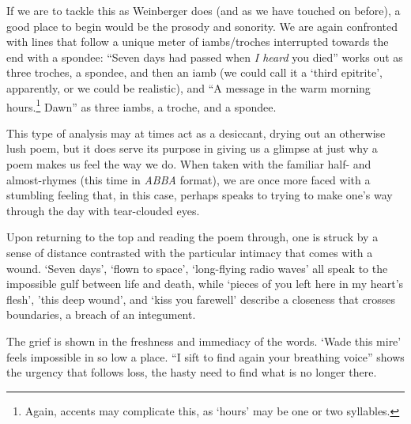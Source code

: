 \documentclass[12pt]{memoir}
\begin{document}
If we are to tackle this as Weinberger does (and as we have touched on before), a good place to begin would be the prosody and sonority. We are again confronted with lines that follow a unique meter of iambs/troches interrupted towards the end with a spondee: ``Seven days had passed when \emph{I heard} you died'' works out as three troches, a spondee, and then an iamb (we could call it a `third epitrite', apparently, or we could be realistic), and ``A message in the warm morning hours.\footnote{Again, accents may complicate this, as `hours' may be one or two syllables.} Dawn'' as three iambs, a troche, and a spondee. 

This type of analysis may at times act as a desiccant, drying out an otherwise lush poem, but it does serve its purpose in giving us a glimpse at just why a poem makes us feel the way we do. When taken with the familiar half- and almost-rhymes (this time in \emph{ABBA} format), we are once more faced with a stumbling feeling that, in this case, perhaps speaks to trying to make one's way through the day with tear-clouded eyes.

Upon returning to the top and reading the poem through, one is struck by a sense of distance contrasted with the particular intimacy that comes with a wound. `Seven days', `flown to space', `long-flying radio waves' all speak to the impossible gulf between life and death, while `pieces of you left here in my heart's flesh', 'this deep wound', and `kiss you farewell' describe a closeness that crosses boundaries, a breach of an integument.

The grief is shown in the freshness and immediacy of the words. `Wade this mire' feels impossible in so low a place. ``I sift to find again your breathing voice'' shows the urgency that follows loss, the hasty need to find what is no longer there.
\end{document}
